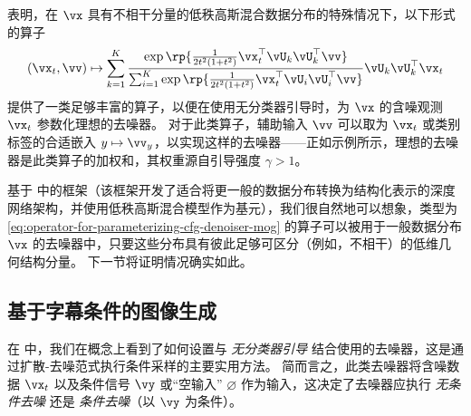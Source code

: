 \documentclass[../../book-main_zh.tex]{subfiles}
\begin{document}
 表明，在 $\vx$ 具有不相干分量的低秩高斯混合数据分布的特殊情况下，以下形式的算子
\begin{equation}\label{eq:operator-for-parameterizing-cfg-denoiser-mog}
    (\vx_t, \vv) \mapsto
    \sum_{k = 1}^{K}\frac{
        \exp\rp{\frac{1}{2t^{2}(1
        + t^{2})}\vx_t^\top \vU_k \vU_k^\top \vv}
    }
    {
        \sum_{i
        = 1}^{K}\exp\rp{\frac{1}{2t^{2}(1
        + t^{2})}\vx_t^\top \vU_i \vU_i^\top \vv}
    }
    \vU_{k}\vU_{k}^{\top}\vx_t
\end{equation}
提供了一类足够丰富的算子，以便在使用无分类器引导时，为 $\vx$ 的含噪观测 $\vx_t$ 参数化理想的去噪器。
对于此类算子，辅助输入 $\vv$ 可以取为 $\vx_t$ 或类别标签的合适嵌入 $y \mapsto \vv_y$，以实现这样的去噪器——正如示例所示，理想的去噪器是此类算子的加权和，其权重源自引导强度 $\gamma>1$。

基于  中的框架（该框架开发了适合将更一般的数据分布转换为结构化表示的深度网络架构，并使用低秩高斯混合模型作为基元），我们很自然地可以想象，类型为 \eqref{eq:operator-for-parameterizing-cfg-denoiser-mog} 的算子可以被用于一般数据分布 $\vx$ 的去噪器中，只要这些分布具有彼此足够可区分（例如，不相干）的低维几何结构分量。
下一节将证明情况确实如此。

\subsection{基于字幕条件的图像生成}\label{sub:text-cond}
在  中，我们在概念上看到了如何设置与 \textit{无分类器引导} 结合使用的去噪器，这是通过扩散-去噪范式执行条件采样的主要实用方法。
简而言之，此类去噪器将含噪数据 $\vx_t$ 以及条件信号 $\vy$ 或“空输入” $\varnothing$ 作为输入，这决定了去噪器应执行 \textit{无条件去噪} 还是 \textit{条件去噪}（以 $\vy$ 为条件）。
\end{document}
